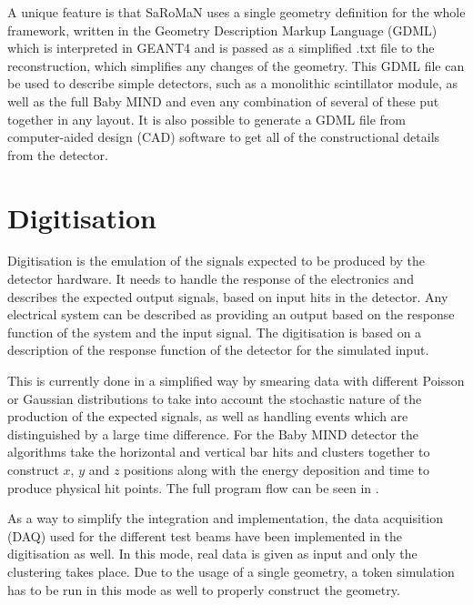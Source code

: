 
A unique feature is that SaRoMaN uses a single geometry definition for the whole framework, written in the Geometry Description Markup Language (GDML)~\cite{GDML} which is interpreted in GEANT4 and is passed as a simplified .txt file to the reconstruction, which simplifies any changes of the geometry. This GDML file can be used to describe simple detectors, such as a monolithic scintillator module, as well as the full Baby MIND and even any combination of several of these put together in any layout. It is also possible to generate a GDML file from computer-aided design (CAD) software to get all of the constructional details from the detector.

\section{Digitisation}
Digitisation is the emulation of the signals expected to be produced by the detector hardware. It needs to handle the response of the electronics and describes the expected output signals, based on input hits in the detector. Any electrical system can be described as providing an output based on the response function of the system and the input signal. The digitisation is based on a description of the response function of the detector for the simulated input.

This is currently done in a simplified way by smearing data with different Poisson or Gaussian distributions to take into account the stochastic nature of the production of the expected signals, as well as handling events which are distinguished by a large time difference. For the Baby MIND detector the algorithms take the horizontal and vertical bar hits and clusters together to construct $x$, $y$ and $z$ positions along with the energy deposition and time to produce physical hit points. The full program flow can be seen in .

As a way to simplify the integration and implementation, the data acquisition (DAQ) used for the different test beams have been implemented in the digitisation as well. In this mode, real data is given as input and only the clustering takes place. Due to the usage of a single geometry, a token simulation has to be run in this mode as well to properly construct the geometry.

